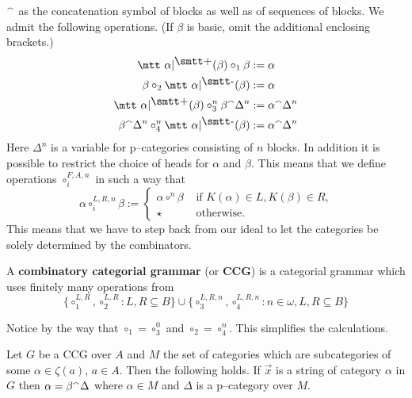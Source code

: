 ${^{\smallfrown}}$ as the concatenation symbol of blocks
as well as of sequences of blocks. We admit the following
operations. (If $\beta$ is basic, omit the additional 
enclosing brackets.)
\begin{align}
\mbox{\mtt $\alpha${\fslash}($\beta$)} \circ_1 \beta & := \alpha \\
\beta        \circ_2 \mbox{\mtt $\alpha${\bslash}($\beta$)} & := \alpha \\
\mbox{\mtt $\alpha${\fslash}($\beta$)} \circ_3^n \beta \conc \Delta^n &
    := \alpha \conc \Delta^n \\
\beta \conc \Delta^n \circ_4^n \mbox{\mtt $\alpha${\bslash}($\beta$)} &
    := \alpha \conc \Delta^n
\end{align}
Here $\Delta^n$ is a variable for p--categories consisting of
$n$ blocks. In addition it is possible to restrict the choice
of heads for $\alpha$ and $\beta$. This means that we define
operations $\circ^{F,A,n}_i$ in such a way that
\begin{equation}
\alpha \circ^{L,R,n}_i \beta :=
\begin{cases}
    \alpha \circ^n \beta & \text{ if $K(\alpha) \in L,
        K(\beta) \in R$,} \\
    \star & \text{ otherwise.}
    \end{cases}
\end{equation}
This means that we have to step back from our ideal to let
the categories be solely determined by the combinators.
\begin{defn}
A \textbf{combinatory categorial grammar} (or \textbf{CCG}) 
is a categorial grammar which uses finitely many operations
from 
\begin{equation}
\{\circ_1^{L,R}, \circ_2^{L,R} : L, R \subseteq B\}
\cup \{\circ_3^{L,R,n}, \circ^{L,R,n}_4 : n \in \omega,
L, R \subseteq B\}
\end{equation}
\end{defn}
Notice by the way that $\circ_1 = \circ_3^0$ and
$\circ_2 = \circ_4^n$. This simplifies the calculations.
\begin{lem}
\label{lem:ccg}
Let $G$ be a CCG over $A$ and $M$ the set of categories which are
subcategories of some $\alpha \in \zeta(a)$, $a \in A$. Then the
following holds. If $\vec{x}$ is a string of category $\alpha$ in
$G$ then $\alpha = \beta {^{\smallfrown}} \Delta$ where $\alpha \in M$ and
$\Delta$ is a  p--category over $M$.
\end{lem}
